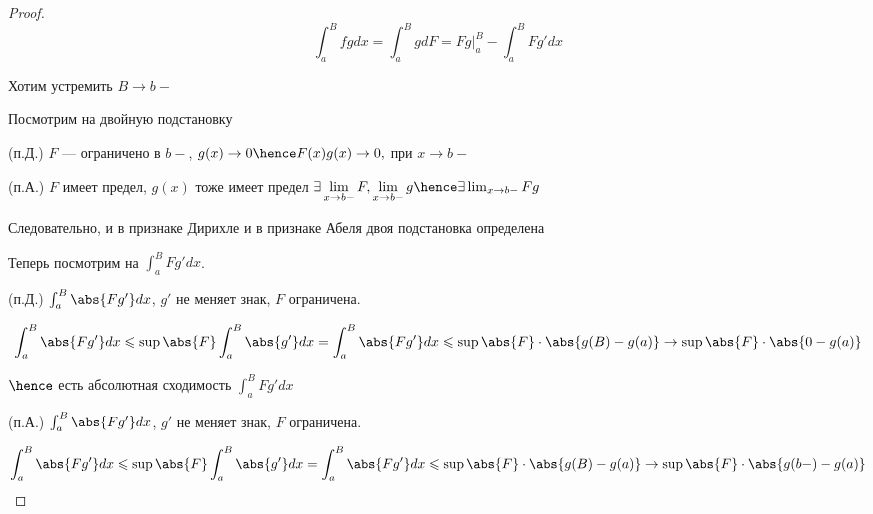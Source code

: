 \begin{proof}
    \[
        \int_a^B fg dx = \int_a^B g dF = Fg \bigg| _a ^ B - \int_a^B F g' dx 
    \]

    Хотим устремить $B \to b-$
    
    Посмотрим на двойную подстановку
    
    (п.Д.) $F$ --- ограничено в $b-$, $g(x) \to 0 \hence F(x)g(x) \to 0, $ при $x \to b-$

    (п.А.) $F$ имеет предел, $g(x)$ тоже имеет предел $\exists \lim\limits_{x \to b-} F, \lim\limits_{x  \to b-} g \hence \exists \lim_{x\to b-} Fg$

    Следовательно, и в признаке Дирихле и в признаке Абеля двоя подстановка определена

    Теперь посмотрим на $\int_a^B Fg' dx$.

    (п.Д.) $\int_a^B \abs{Fg'} dx$, $g'$ не меняет знак, $F$ ограничена.

    \[
        \int_a^B \abs{Fg'} dx \leqslant \sup \abs{F} \int_a^B \abs{g'} dx = \int_a^B \abs{Fg'} dx \leqslant \sup \abs{F} \cdot \abs{g(B) - g(a)} \to \sup \abs{F} \cdot \abs{0 - g(a)}
    \]

    $\hence $ есть абсолютная сходимость $\int_a^B Fg' dx$

    (п.А.) $\int_a^B \abs{Fg'} dx$, $g'$ не меняет знак, $F$ ограничена.


    \[
        \int_a^B \abs{Fg'} dx \leqslant \sup \abs{F} \int_a^B \abs{g'} dx = \int_a^B \abs{Fg'} dx \leqslant \sup \abs{F} \cdot \abs{g(B) - g(a)} \to \sup \abs{F} \cdot \abs{g(b-) - g(a)}
    \]

\end{proof}



